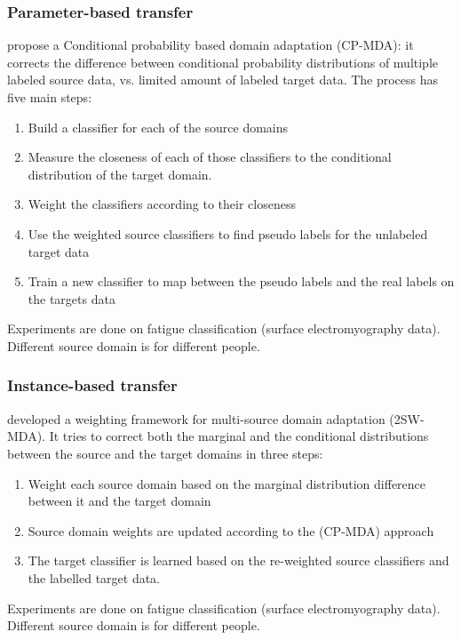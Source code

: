 
  \subsubsection{Parameter-based transfer}
  \citep{chattopadhyay2012multisource} propose a Conditional probability based domain adaptation (CP-MDA): it corrects the difference between conditional probability distributions of multiple labeled source data, vs. limited amount of labeled target data. The process has five main steps:
  \begin{enumerate}
      \item Build a classifier for each of the source domains
      \item Measure the closeness of each of those classifiers to the conditional distribution of the target domain.
      \item Weight the classifiers according to their closeness
      \item Use the weighted source classifiers to find pseudo labels for the unlabeled target data
      \item Train a new classifier to map between the pseudo labels and the real labels on the targets data
  \end{enumerate}
  Experiments are done on fatigue classification (surface electromyography data). Different source domain is for different people.

  \subsubsection{Instance-based transfer}
  \citep{chattopadhyay2012multisource} developed a weighting framework for multi-source domain adaptation (2SW-MDA). It tries to correct both the marginal and the conditional distributions between the source and the target domains in three steps:
  \begin{enumerate}
      \item Weight each source domain based on the marginal distribution difference between it and the target domain
      \item Source domain weights are updated according to the (CP-MDA) approach
      \item The target classifier is learned based on the re-weighted source classifiers and the labelled target data.
  \end{enumerate}
  Experiments are done on fatigue classification (surface electromyography data). Different source domain is for different people.

